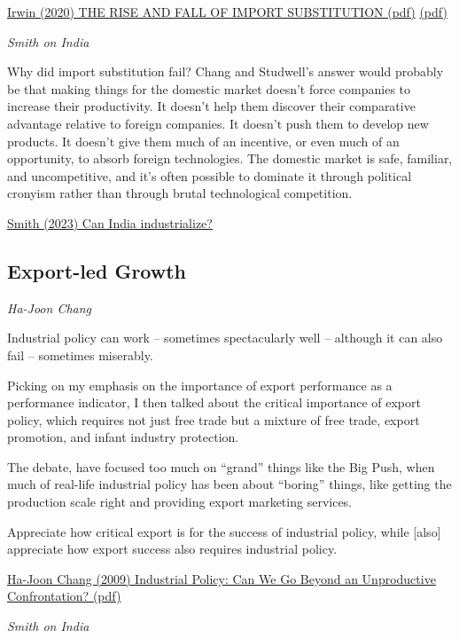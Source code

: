 \documentclass[
]{book}
\begin{document}
\href{https://www.nber.org/system/files/working_papers/w27919/w27919.pdf}{Irwin (2020) THE RISE AND FALL OF IMPORT SUBSTITUTION (pdf)}
\href{pdf/Irwin_2020_Rise_and_Fall_of_Import_Substitution.pdf}{(pdf)}

\emph{Smith on India}

Why did import substitution fail? Chang and Studwell's answer would probably be that making things for the domestic market doesn't force companies to increase their productivity. It doesn't help them discover their comparative advantage relative to foreign companies. It doesn't push them to develop new products. It doesn't give them much of an incentive, or even much of an opportunity, to absorb foreign technologies. The domestic market is safe, familiar, and uncompetitive, and it's often possible to dominate it through political cronyism rather than through brutal technological competition.

\href{https://noahpinion.substack.com/p/can-india-industrialize}{Smith (2023) Can India industrialize?}

\hypertarget{export-led-growth}{%
\subsection{Export-led Growth}\label{export-led-growth}}

\emph{Ha-Joon Chang}

Industrial policy can work -- sometimes spectacularly well -- although it can also fail --
sometimes miserably.

Picking on my emphasis on the importance
of export performance as a performance indicator, I then talked about the critical importance
of export policy, which requires not just free trade but a mixture of free trade, export
promotion, and infant industry protection.

The debate, have focused too much on ``grand'' things like the
Big Push, when much of real-life industrial policy has been about ``boring'' things, like
getting the production scale right and providing export marketing services.

Appreciate how critical
export is for the success of industrial policy, while {[}also{]} appreciate
how export success also requires industrial policy.

\href{pdf/Chang_2009_Industrial_Policy_Confrontation.pdf}{Ha-Joon Chang (2009) Industrial Policy: Can We Go Beyond an Unproductive Confrontation? (pdf)}

\emph{Smith on India}
\end{document}
